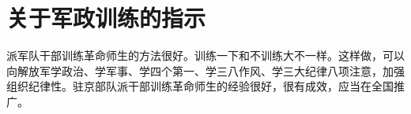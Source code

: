 \section[关于军政训练的指示（一九六六年十二月三十一日）]{关于军政训练的指示}


派军队干部训练革命师生的方法很好。训练一下和不训练大不一样。这样做，可以向解放军学政治、学军事、学四个第一、学三八作风、学三大纪律八项注意，加强组织纪律性。驻京部队派干部训练革命师生的经验很好，很有成效，应当在全国推广。

